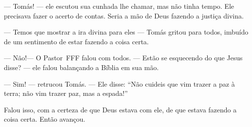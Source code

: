 --- Tomás! --- ele escutou sua cunhada lhe chamar, mas não tinha tempo. Ele precisava fazer o acerto de contas. Seria a mão de Deus fazendo a justiça divina.

--- Temos que mostrar a ira divina para eles --- Tomás gritou para todos, imbuído de um sentimento de estar fazendo a coisa certa.

--- Não!--- O Pastor~FFF falou com todos. --- Estão se esquecendo do que Jesus disse? --- ele falou\mudanca{,} balançando a Bíblia em sua mão.

--- Sim! --- retrucou Tomás. --- Ele disse: ``Não cuideis que vim trazer a paz à terra; não vim trazer paz, mas a espada!''

Falou isso, com a certeza de que Deus estava com ele, de que estava fazendo a coisa certa. Então avançou.
